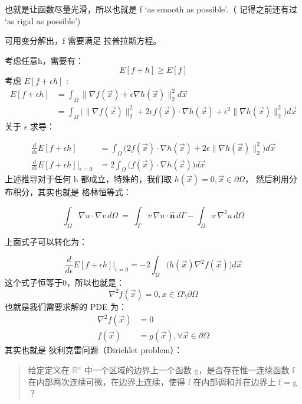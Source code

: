 \documentclass[
]{book}
\begin{document}
也就是让函数尽量光滑，所以也就是 f `as smooth as possible'.（ 记得之前还有过 `as rigid as possible')

可用变分解出，f 需要满足 拉普拉斯方程。

考虑任意h，需要有：
\[
E[f + h] \ge E[f]
\]
考虑 \(E[f + \epsilon h]\) :
\[
\begin{aligned}
E[f +  \epsilon h] &= \int_\Omega \parallel \nabla f(\vec{x}) + \epsilon \nabla h(\vec{x}) \parallel_2^2 d \vec{x} \\
&= \int_\Omega \big( \parallel \nabla f(\vec{x}) \parallel_2^2 + 2 \epsilon f(\vec{x}) \cdot \nabla h(\vec{x}) + \epsilon^2 \parallel \nabla h(\vec{x})\parallel_2^2 \big)  d \vec{x}
\end{aligned}
\]
关于 \(\epsilon\) 求导：

\[
\begin{aligned}
\frac{ d }{d \epsilon}E[f +  \epsilon h] &= \int_\Omega \big( 2  f(\vec{x}) \cdot \nabla h(\vec{x}) +2 \epsilon \parallel \nabla h(\vec{x})\parallel_2^2 \big)  d \vec{x} \\
\frac{ d }{d \epsilon}E[f +  \epsilon h] |_{\epsilon = 0} &= 2 \int_\Omega \big(   f(\vec{x}) \cdot \nabla h(\vec{x})  \big)  d \vec{x} 
\end{aligned}
\]
上述推导对于任何 h 都成立，特殊的，我们取 \(h(\vec{x}) = 0, \vec{x} \in \partial \Omega\)， 然后利用分布积分，其实也就是 格林恒等式：

\[{\displaystyle \int _{\Omega }\nabla u\cdot \nabla v\,d\Omega \ =\ \int _{\Gamma }v\,\nabla u\cdot {\hat {\mathbf {n} }}\,d\Gamma -\int _{\Omega }v\,\nabla ^{2}\!u\,d\Omega }\]

上面式子可以转化为：

\[
\frac{ d }{d \epsilon}E[f +  \epsilon h] |_{\epsilon = 0} = -2 \int_\Omega \big(   h(\vec{x}) \nabla^2 f(\vec{x})  \big)  d \vec{x} 
\]
这个式子恒等于0，所以也就是：
\[
\nabla^2 f(\vec{x}) = 0, x \in \Omega \setminus  \partial \Omega
\]
也就是我们需要求解的 PDE 为：
\[
\begin{aligned}
\nabla^2 f(\vec{x}) &= 0 \\
f(\vec{x}) &= g(\vec{x}), \forall \vec{x} \in \partial \Omega
\end{aligned}
\]
其实也就是 狄利克雷问题（Dirichlet problem）：

\begin{quote}
给定定义在 \(\mathbb{R}^n\) 中一个区域的边界上一个函数 g，是否存在惟一连续函数 f 在内部两次连续可微，在边界上连续，使得 f 在内部调和并在边界上 f = g ？
\end{quote}
\end{document}
